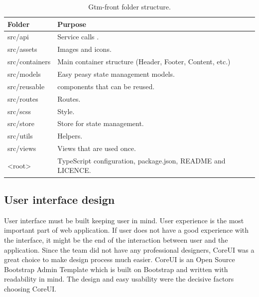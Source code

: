 \begin{table}[h]
    \centering
    \begin{tabular}{ | p{3cm} | p{10cm} |}
        \hline
        Folder & Purpose\\
        \hline
        src/api & Service calls .\\
        \hline
        src/assets & Images and icons. \\
        \hline
        src/containers & Main container structure (Header, Footer, Content, etc.)\\
        \hline
        src/models & Easy peasy state management models.\\
        \hline
        src/reusable & components that can be reused.\\
        \hline
        src/routes & Routes.\\
        \hline
        src/scss & Style.\\
        \hline
        src/store & Store for state management.\\
        \hline
        src/utils & Helpers.\\
        \hline
        src/views & Views that are used once.\\
        \hline
        <root> & TypeScript configuration, package.json, README and LICENCE.\\
        \hline
    \end{tabular}
    \caption{Gtm-front folder structure.}
    \label{tab:gtm-front-folder-structure}
\end{table}

\subsection{User interface design}\label{subsec:user-interface-design}
User interface must be built keeping user in mind.
User experience is the most important part of web application.
If user does not have a good experience with the interface, it might be the end of the interaction between user and the application.
Since the team did not have any professional designers, CoreUI was a great choice to make design process much easier.
CoreUI is an Open Source Bootstrap Admin Template which is built on Bootstrap and written with readability in mind.
The design and easy usability were the decisive factors choosing CoreUI.

